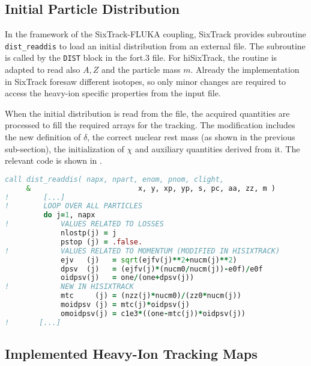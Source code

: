 \subsection{Initial Particle Distribution}

In the framework of the SixTrack-FLUKA coupling, SixTrack provides subroutine \lstinline{dist_readdis} to load an initial distribution from an external file. The subroutine is called by the \lstinline{DIST} block in the fort.3 file. For hiSixTrack, the routine is adapted to read also $A,Z$ and the particle mass $m$. Already the implementation in SixTrack foresaw different isotopes, so only minor changes are required to access the heavy-ion specific properties from the input file.

When the initial distribution is read from the file, the acquired quantities are processed to fill the required arrays for the tracking. The modification includes the new definition of $\delta$, the correct nuclear rest mass (as shown in the previous sub-section), the initialization of $\chi$ and auxiliary quantities derived from it. The relevant code is shown in .


\vspace{0.5cm}
\begin{minipage}{\linewidth}
\begin{lstlisting}[language=Fortran,caption=Definition of the subroutine \lstinline{dist_readdis} in hiSixTrack.,label=lst_dist_readdis]
         call dist_readdis( napx, npart, enom, pnom, clight,
     &                         x, y, xp, yp, s, pc, aa, zz, m )
!        [...]         
!        LOOP OVER ALL PARTICLES
         do j=1, napx
!            VALUES RELATED TO LOSSES
             nlostp(j) = j
             pstop (j) = .false.
!            VALUES RELATED TO MOMENTUM (MODIFIED IN HISIXTRACK)
             ejv   (j)   = sqrt(ejfv(j)**2+nucm(j)**2)	             
             dpsv  (j)   = (ejfv(j)*(nucm0/nucm(j))-e0f)/e0f
             oidpsv(j)   = one/(one+dpsv(j))
!            NEW IN HISIXTRACK
             mtc     (j) = (nzz(j)*nucm0)/(zz0*nucm(j))  
             moidpsv (j) = mtc(j)*oidpsv(j)
             omoidpsv(j) = c1e3*((one-mtc(j))*oidpsv(j))
!       [...]
\end{lstlisting}
\end{minipage}




\subsection{Implemented Heavy-Ion Tracking Maps} \label{chap:implement}

